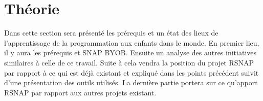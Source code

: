 \chapter{Théorie}
Dans cette section sera présenté les prérequis et un état des lieux de l'apprentissage de la programmation aux enfants dans le monde. En premier lieu, il y aura les prérequis et SNAP BYOB. Ensuite un analyse des autres initiatives similaires à celle de ce travail. Suite à cela vendra la position du projet RSNAP par rapport à ce qui est déjà existant et expliqué dans les points précédent suivit d'une présentation des outils utilisés. La dernière partie portera sur ce qu'apport RSNAP par rapport aux autres projets existant.





